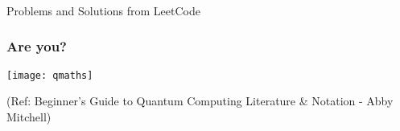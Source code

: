 \begin{frame}[fragile]\frametitle{}
\begin{center}
{\Large Problems and Solutions from LeetCode}
\end{center}

\end{frame}


 \begin{frame}[fragile]\frametitle{Are you?}

\begin{center}
\texttt{[image: qmaths]}
\end{center}

\tiny{(Ref: Beginner’s Guide to Quantum Computing Literature \& Notation - Abby Mitchell)}

\end{frame}

